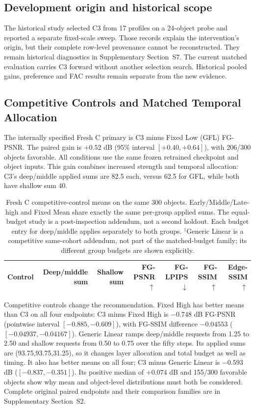 \documentclass[times,twocolumn,final]{elsarticle}
\begin{document}
\subsection{Development origin and historical scope}
\label{subsec:c3}
The historical study selected C3 from 17 profiles on a 24-object probe and reported a separate fixed-scale sweep. Those records explain the intervention's origin, but their complete row-level provenance cannot be reconstructed. They remain historical diagnostics in Supplementary Section~S7. The current matched evaluation carries C3 forward without another selection search. Historical pooled gains, preference and FAC results remain separate from the new evidence.

\subsection{Competitive Controls and Matched Temporal Allocation}
\label{subsec:largescale}

The internally specified Fresh C primary is C3 minus Fixed Low (GFL) FG-PSNR. The paired gain is $+0.52$ dB (95\% interval $[+0.40,+0.64]$), with 206/300 objects favorable. All conditions use the same frozen retrained checkpoint and object inputs. This gain combines increased strength and temporal allocation: C3's deep/middle applied sums are 82.5 each, versus 62.5 for GFL, while both have shallow sum 40.

\begin{table}[t]
\centering\scriptsize\setlength{\tabcolsep}{4pt}
\caption{Fresh C competitive-control means on the same 300 objects. Early/Middle/Late-high and Fixed Mean share exactly the same per-group applied sums. The equal-budget study is a post-inspection addendum, not a second holdout. Each budget entry for deep/middle applies separately to both groups. $^\dagger$Generic Linear is a competitive same-cohort addendum, not part of the matched-budget family; its different group budgets are shown explicitly.}
\label{tab:freshc-absolute}\label{tab:matched-budget300}
\begin{tabular}{lrrrrrr}
\toprule Control & Deep/middle sum & Shallow sum & FG-PSNR$\uparrow$ & FG-LPIPS$\downarrow$ & FG-SSIM$\uparrow$ & Edge-SSIM$\uparrow$ \\
\midrule

\bottomrule
\end{tabular}
\end{table}

Competitive controls change the recommendation. Fixed High has better means than C3 on all four endpoints: C3 minus Fixed High is $-0.748$ dB FG-PSNR (pointwise interval $[-0.885,-0.609]$), with FG-SSIM difference $-0.04553$ ($[-0.04937,-0.04167]$). Generic Linear ramps deep/middle requests from 1.25 to 2.50 and shallow requests from 0.50 to 0.75 over the fifty steps. Its applied sums are (93.75,93.75,31.25), so it changes layer allocation and total budget as well as timing. It also has better means on all four; C3 minus Generic Linear is $-0.593$ dB ($[-0.837,-0.351]$). Its positive median of $+0.074$ dB and 155/300 favorable objects show why mean and object-level distributions must both be considered. Complete original paired endpoints and their comparison families are in Supplementary Section~S2.
\end{document}
